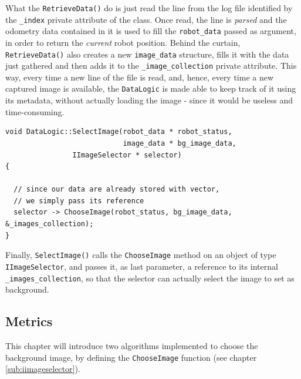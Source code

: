 %
What the \texttt{RetrieveData()} do is just read the line from the log 
file identified by the \texttt{\_index} private attribute of the class.
Once read, the line is \textit{parsed} and the odometry data contained 
in it is used to fill the \texttt{robot\_data} passed as argument, in 
order to return the \textit{current} robot position.
%
Behind the curtain, \texttt{RetrieveData()} also creates a new 
\texttt{image\_data} structure, fills it with the data just 
gathered and then adds it to the \texttt{\_image\_collection} 
private attribute.
%
This way, every time a new line of the file is read, and, hence, 
every time a new captured image is available, the \texttt{DataLogic} 
is made able to keep track of it using its metadata, without actually 
loading the image - since it would be useless and time-consuming.
%
\begin{lstlisting}[caption={\texttt{DataLogic::SelectImage()} method}, label={code:selectimage_method}, frame=trBL]
void DataLogic::SelectImage(robot_data * robot_status,
                            image_data * bg_image_data,
			    IImageSelector * selector)
{

  // since our data are already stored with vector,
  // we simply pass its reference
  selector -> ChooseImage(robot_status, bg_image_data, &_images_collection);
}
\end{lstlisting}
%
Finally, \texttt{SelectImage()} calls the \texttt{ChooseImage} method 
on an object of type \texttt{IImageSelector}, and passes it, as last 
parameter, a reference to its internal \texttt{\_images\_collection}, 
so that the selector can actually select the image to set as 
background.
%
%
%
\subsection{Metrics}
\label{sub:metrics}

This chapter will introduce two algorithms implemented to choose the
background image, by defining the \texttt{ChooseImage} function (see
chapter \ref{sub:iimageselector}).

